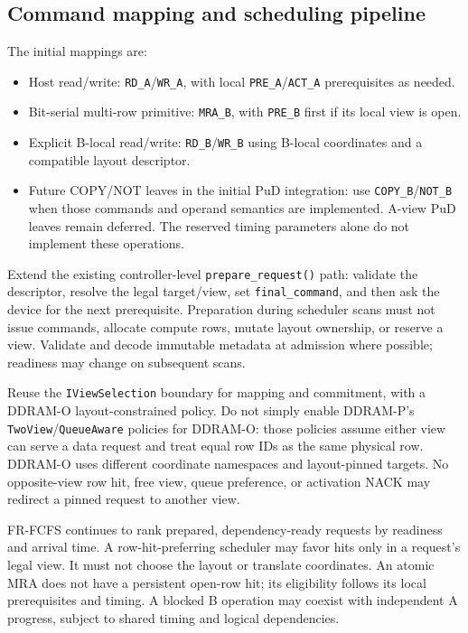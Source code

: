 \documentclass[9pt,twocolumn]{extarticle}
\newcommand{\cmd}[1]{\texttt{#1}}
\begin{document}
\subsection{Command mapping and scheduling pipeline}

The initial mappings are:
\begin{itemize}
  \item Host read/write: \cmd{RD\_A}/\cmd{WR\_A}, with local
        \cmd{PRE\_A}/\cmd{ACT\_A} prerequisites as needed.
  \item Bit-serial multi-row primitive: \cmd{MRA\_B}, with
        \cmd{PRE\_B} first if its local view is open.
  \item Explicit B-local read/write: \cmd{RD\_B}/\cmd{WR\_B} using B-local
        coordinates and a compatible layout descriptor.
  \item Future COPY/NOT leaves in the initial PuD integration: use
        \cmd{COPY\_B}/\cmd{NOT\_B} when those commands and operand semantics
        are implemented. A-view PuD leaves remain deferred. The
        reserved timing parameters alone do not implement these operations.
\end{itemize}

Extend the existing controller-level \cmd{prepare\_request()} path: validate
the descriptor, resolve the legal target/view, set \cmd{final\_command}, and
then ask the device for the next prerequisite. Preparation during scheduler
scans must not issue commands, allocate compute rows, mutate layout ownership,
or reserve a view. Validate and decode immutable metadata at admission where
possible; readiness may change on subsequent scans.

Reuse the \cmd{IViewSelection} boundary for mapping and commitment, with a
DDRAM-O layout-constrained policy. Do not simply enable DDRAM-P's
\cmd{TwoView}/\cmd{QueueAware} policies for DDRAM-O: those policies assume
either view can serve a data request and treat equal row IDs as the same
physical row. DDRAM-O uses different coordinate namespaces and layout-pinned
targets. No opposite-view row hit, free view, queue preference, or activation
NACK may redirect a pinned request to another view.

FR-FCFS continues to rank prepared, dependency-ready requests by readiness
and arrival time. A row-hit-preferring scheduler may favor hits only in a
request's legal view. It must not choose the layout or translate coordinates.
An atomic MRA does not have a persistent open-row hit; its eligibility follows
its local prerequisites and timing. A blocked B operation may coexist with
independent A progress, subject to shared timing and logical dependencies.
\end{document}
